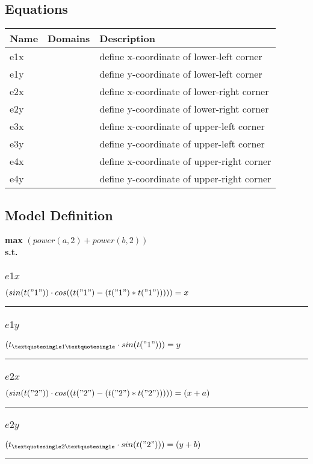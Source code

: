\documentclass[11pt]{article}
\begin{document}
\subsection*{Equations}
\begin{tabularx}{\textwidth}{| l | l | X |}
\hline
\textbf{Name} & \textbf{Domains} & \textbf{Description}\\
\hline
\endhead

e1x &  & define x-coordinate of lower-left corner\\
e1y &  & define y-coordinate of lower-left corner\\
e2x &  & define x-coordinate of lower-right corner\\
e2y &  & define y-coordinate of lower-right corner\\
e3x &  & define x-coordinate of upper-left corner\\
e3y &  & define y-coordinate of upper-left corner\\
e4x &  & define x-coordinate of upper-right corner\\
e4y &  & define y-coordinate of upper-right corner\\
\hline
\end{tabularx}
\subsection*{Model Definition}
\textbf{max} $(power(a,2) + power(b,2))$\\
\textbf{s.t.}
\subsubsection*{$e1x$}
$
(sin(t("1")) \cdot cos((t("1") - (t("1") * t("1"))))) = x
$
\vspace{5pt}
\hrule
\subsubsection*{$e1y$}
$
(t_{\textquotesingle 1 \textquotesingle} \cdot sin(t("1"))) = y
$
\vspace{5pt}
\hrule
\subsubsection*{$e2x$}
$
(sin(t("2")) \cdot cos((t("2") - (t("2") * t("2"))))) = (x + a)
$
\vspace{5pt}
\hrule
\subsubsection*{$e2y$}
$
(t_{\textquotesingle 2 \textquotesingle} \cdot sin(t("2"))) = (y + b)
$
\vspace{5pt}
\hrule
\end{document}
